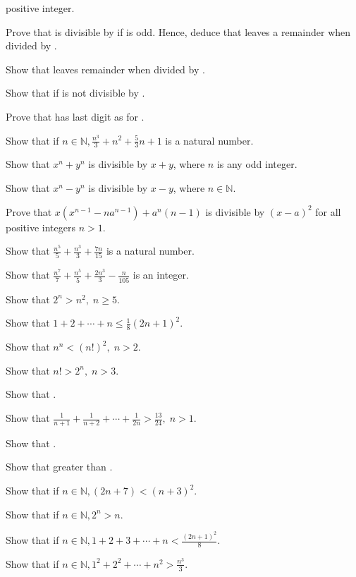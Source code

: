   positive integer.
\item Prove that  is divisible by  if  is odd. Hence, deduce that  leaves
  a remainder  when divided by .
\item Show that  leaves remainder  when divided by .
\item Show that if  is not divisible by .
\item Prove that  has last digit as  for .
\item Show that if $n\in\mathbb{N}, \frac{n^3}{3} + n^2 + \frac{5}{3}n + 1$ is a natural number.
\item Show that $x^n + y^n$ is divisible by $x + y$, where $n$ is any odd integer.
\item Show that $x^n - y^n$ is divisible by $x - y$, where $n\in\mathbb{N}$.
\item Prove that $x(x^{n - 1} - na^{n - 1}) + a^n(n - 1)$ is divisible by $(x - a)^2$ for all positive integers $n > 1$.
\item Show that $\frac{n^5}{5} + \frac{n^3}{3} + \frac{7n}{15}$ is a natural number.
\item Show that $\frac{n^7}{7} + \frac{n^5}{5} + \frac{2n^3}{3} - \frac{n}{105}$ is an integer.
\item Show that $2^n > n^2,\;n\geq 5$.
\item Show that $1 + 2 + \cdots + n\leq \frac{1}{8}(2n + 1)^2$.
\item Show that $n^n < (n!)^2,\;n>2$.
\item Show that $n! > 2^n,\;n>3$.
\item Show that .
\item Show that $\frac{1}{n + 1} + \frac{1}{n + 2} + \cdots + \frac{1}{2n} > \frac{13}{24},\;n>1$.
\item Show that .
\item Show that  greater
  than .
\item Show that if $n\in\mathbb{N}, (2n + 7) < (n + 3)^2$.
\item Show that if $n\in\mathbb{N}, 2^n > n$.
\item Show that if $n\in\mathbb{N}, 1 + 2 + 3 + \cdots + n < \frac{(2n + 1)^2}{8}$.
\item Show that if $n\in\mathbb{N}, 1^2 + 2^2 + \cdots + n^2 > \frac{n^3}{3}$.
